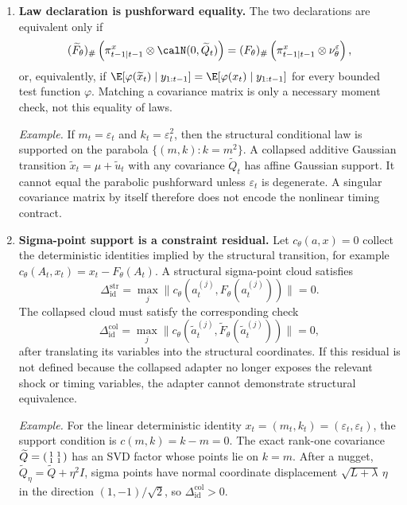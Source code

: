 \begin{enumerate}[label=(\roman*)]
  \item \textbf{Law declaration is pushforward equality.}  The two
    declarations are equivalent only if
    \[
      (\widetilde F_\theta)_\#
      \left(\pi_{t-1|t-1}^x\otimes\calN(0,\widetilde Q_t)\right)
      =
      (F_\theta)_\#
      \left(\pi_{t-1|t-1}^x\otimes\nu_\theta^\varepsilon\right),
      \label{eq:bf-collapsed-law-equivalence}
    \]
    or, equivalently, if
    $\E[\varphi(\widetilde x_t)\mid y_{1:t-1}]
    =\E[\varphi(x_t)\mid y_{1:t-1}]$ for every bounded test function
    $\varphi$.  Matching a covariance matrix is only a necessary moment check,
    not this equality of laws.

    \emph{Example.}  If $m_t=\varepsilon_t$ and $k_t=\varepsilon_t^2$, then the
    structural conditional law is supported on the parabola
    $\{(m,k):k=m^2\}$.  A collapsed additive Gaussian transition
    $\widetilde x_t=\mu+\widetilde u_t$ with any covariance
    $\widetilde Q_t$ has affine Gaussian support.  It cannot equal the
    parabolic pushforward unless $\varepsilon_t$ is degenerate.  A singular
    covariance matrix by itself therefore does not encode the nonlinear timing
    contract.

  \item \textbf{Sigma-point support is a constraint residual.}  Let
    $c_\theta(a,x)=0$ collect the deterministic identities implied by the
    structural transition, for example
    $c_\theta(A_t,x_t)=x_t-F_\theta(A_t)$.  A structural sigma-point cloud
    satisfies
    \[
      \Delta_{\mathrm{id}}^{\mathrm{str}}
      =
      \max_j \|c_\theta(a_t^{(j)},F_\theta(a_t^{(j)}))\|
      =0.
    \]
    The collapsed cloud must satisfy the corresponding check
    \[
      \Delta_{\mathrm{id}}^{\mathrm{col}}
      =
      \max_j
      \|c_\theta(\widetilde a_t^{(j)},
        \widetilde F_\theta(\widetilde a_t^{(j)}))\|
      =0,
      \label{eq:bf-collapsed-identity-residual}
    \]
    after translating its variables into the structural coordinates.  If this
    residual is not defined because the collapsed adapter no longer exposes the
    relevant shock or timing variables, the adapter cannot demonstrate
    structural equivalence.

    \emph{Example.}  For the linear deterministic identity
    $x_t=(m_t,k_t)=(\varepsilon_t,\varepsilon_t)$, the support condition is
    $c(m,k)=k-m=0$.  The exact rank-one covariance
    $\widetilde Q=\begin{psmallmatrix}1&1\\1&1\end{psmallmatrix}$ has an SVD
    factor whose points lie on $k=m$.  After a nugget,
    $\widetilde Q_\eta=\widetilde Q+\eta^2I$, sigma points have normal
    coordinate displacement $\sqrt{L+\lambda}\,\eta$ in the direction
    $(1,-1)/\sqrt2$, so $\Delta_{\mathrm{id}}^{\mathrm{col}}>0$.


\end{enumerate}
